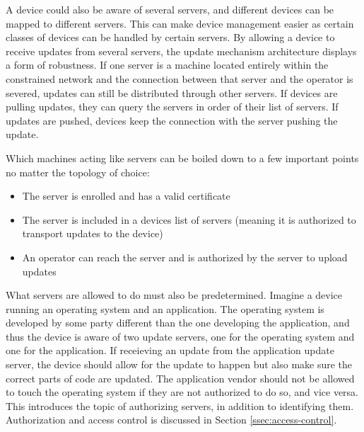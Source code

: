 \documentclass[0-thesis.tex]{subfiles}
\begin{document}
A device could also be aware of several servers, and different devices can be mapped to
different servers. This can make device management easier as certain classes of devices
can be handled by certain servers. By allowing a device to receive updates from several
servers, the update mechanism architecture displays a form of robustness. If one server is
a machine located entirely within the constrained network and the connection between that
server and the operator is severed, updates can still be distributed through other
servers. If devices are pulling updates, they can query the servers in order of their list
of servers. If updates are pushed, devices keep the connection with the server pushing the
update.

Which machines acting like servers can be boiled down to a few important points no matter
the topology of choice:

\begin{itemize}
    \item The server is enrolled and has a valid certificate
    \item The server is included in a devices list of servers (meaning it is authorized to
            transport updates to the device)
    \item An operator can reach the server and is authorized by the server to upload updates
\end{itemize}

What servers are allowed to do must also be predetermined. Imagine a device running an
operating system and an application. The operating system is developed by some party
different than the one developing the application, and thus the device is aware of two
update servers, one for the operating system and one for the application. If receieving an
update from the application update server, the device should allow for the update to
happen but also make sure the correct parts of code are updated. The application vendor
should not be allowed to touch the operating system if they are not authorized to do so,
and vice versa. This introduces the topic of authorizing servers, in addition to
identifying them. Authorization and access control is discussed in Section
\ref{ssec:access-control}.
\end{document}
